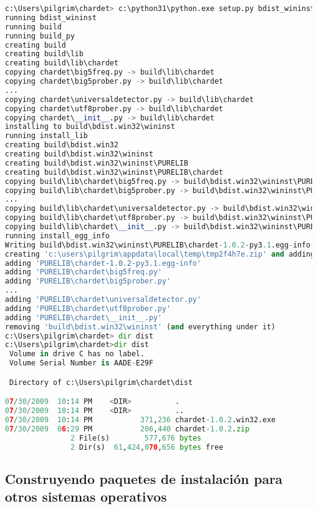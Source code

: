 {\begin{lstlisting}[language=Python,breaklines=true]
c:\Users\pilgrim\chardet> c:\python31\python.exe setup.py bdist_wininst
running bdist_wininst
running build
running build_py
creating build
creating build\lib
creating build\lib\chardet
copying chardet\big5freq.py -> build\lib\chardet
copying chardet\big5prober.py -> build\lib\chardet
...
copying chardet\universaldetector.py -> build\lib\chardet
copying chardet\utf8prober.py -> build\lib\chardet
copying chardet\__init__.py -> build\lib\chardet
installing to build\bdist.win32\wininst
running install_lib
creating build\bdist.win32
creating build\bdist.win32\wininst
creating build\bdist.win32\wininst\PURELIB
creating build\bdist.win32\wininst\PURELIB\chardet
copying build\lib\chardet\big5freq.py -> build\bdist.win32\wininst\PURELIB\chardet
copying build\lib\chardet\big5prober.py -> build\bdist.win32\wininst\PURELIB\chardet
...
copying build\lib\chardet\universaldetector.py -> build\bdist.win32\wininst\PURELIB\chardet
copying build\lib\chardet\utf8prober.py -> build\bdist.win32\wininst\PURELIB\chardet
copying build\lib\chardet\__init__.py -> build\bdist.win32\wininst\PURELIB\chardet
running install_egg_info
Writing build\bdist.win32\wininst\PURELIB\chardet-1.0.2-py3.1.egg-info
creating 'c:\users\pilgrim\appdata\local\temp\tmp2f4h7e.zip' and adding '.' to it
adding 'PURELIB\chardet-1.0.2-py3.1.egg-info'
adding 'PURELIB\chardet\big5freq.py'
adding 'PURELIB\chardet\big5prober.py'
...
adding 'PURELIB\chardet\universaldetector.py'
adding 'PURELIB\chardet\utf8prober.py'
adding 'PURELIB\chardet\__init__.py'
removing 'build\bdist.win32\wininst' (and everything under it)
c:\Users\pilgrim\chardet> dir dist
c:\Users\pilgrim\chardet>dir dist
 Volume in drive C has no label.
 Volume Serial Number is AADE-E29F

 Directory of c:\Users\pilgrim\chardet\dist

07/30/2009  10:14 PM    <DIR>          .
07/30/2009  10:14 PM    <DIR>          ..
07/30/2009  10:14 PM           371,236 chardet-1.0.2.win32.exe
07/30/2009  06:29 PM           206,440 chardet-1.0.2.zip
               2 File(s)        577,676 bytes
               2 Dir(s)  61,424,070,656 bytes free
\end{lstlisting}

\subsection{Construyendo paquetes de instalación para otros sistemas operativos}

}
